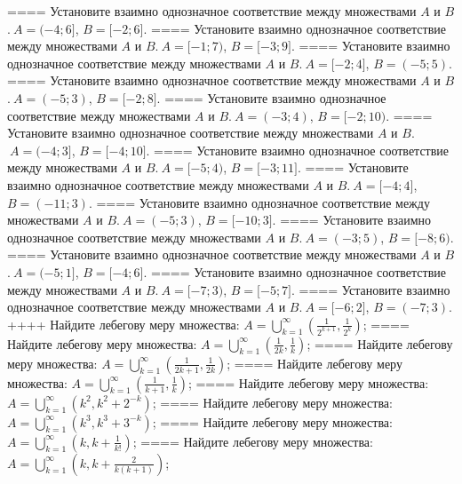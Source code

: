 ====
Установите взаимно однозначное соответствие между множествами \(A\) и \(B\).\(\ A = ( - 4;6\rbrack\), \(B = \lbrack - 2;6\rbrack\).
====
Установите взаимно однозначное соответствие между множествами \(A\) и \(B\).\(\ A = \lbrack - 1;7)\), \(B = \lbrack - 3;9\rbrack\).
====
Установите взаимно однозначное соответствие между множествами \(A\) и \(B\).\(\ A = \lbrack - 2;4\rbrack\), \(B = ( - 5;5)\).
====
Установите взаимно однозначное соответствие между множествами \(A\) и \(B\).\(\ A = ( - 5;3)\), \(B = \lbrack - 2;8\rbrack\).
====
Установите взаимно однозначное соответствие между множествами \(A\) и \(B\).\(\ A = ( - 3;4)\), \(B = \lbrack - 2;10)\).
====
Установите взаимно однозначное соответствие между множествами \(A\) и \(B\).\(\ A = ( - 4;3\rbrack\), \(B = \lbrack - 4;10\rbrack\).
====
Установите взаимно однозначное соответствие между множествами \(A\) и \(B\).\(\ A = \lbrack - 5;4)\), \(B = \lbrack - 3;11\rbrack\).
====
Установите взаимно однозначное соответствие между множествами \(A\) и \(B\).\(\ A = \lbrack - 4;4\rbrack\), \(B = ( - 11;3)\).
====
Установите взаимно однозначное соответствие между множествами \(A\) и \(B\).\(\ A = ( - 5;3)\), \(B = \lbrack - 10;3\rbrack\).
====
Установите взаимно однозначное соответствие между множествами \(A\) и \(B\).\(\ A = ( - 3;5)\), \(B = \lbrack - 8;6)\).
====
Установите взаимно однозначное соответствие между множествами \(A\) и \(B\).\(\ A = ( - 5;1\rbrack\), \(B = \lbrack - 4;6\rbrack\).
====
Установите взаимно однозначное соответствие между множествами \(A\) и \(B\).\(\ A = \lbrack - 7;3)\), \(B = \lbrack - 5;7\rbrack\).
====
Установите взаимно однозначное соответствие между множествами \(A\) и \(B\).\(\ A = \lbrack - 6;2\rbrack\), \(B = ( - 7;3)\).
++++
Найдите лебегову меру множества: \(A = \bigcup_{k = 1}^{\infty}\left( \frac{1}{2^{k + 1}},\frac{1}{2^{k}} \right)\);
====
Найдите лебегову меру множества: \(A = \bigcup_{k = 1}^{\infty}\left( \frac{1}{2k},\frac{1}{k} \right)\);
====
Найдите лебегову меру множества: \(A = \bigcup_{k = 1}^{\infty}\left( \frac{1}{2k + 1},\frac{1}{2k} \right)\);
====
Найдите лебегову меру множества: \(A = \bigcup_{k = 1}^{\infty}\left( \frac{1}{k + 1},\frac{1}{k} \right)\);
====
Найдите лебегову меру множества: \(A = \bigcup_{k = 1}^{\infty}\left( k^{2},k^{2} + 2^{- k} \right)\);
====
Найдите лебегову меру множества: \(A = \bigcup_{k = 1}^{\infty}\left( k^{3},k^{3} + 3^{- k} \right)\);
====
Найдите лебегову меру множества: \(A = \bigcup_{k = 1}^{\infty}\left( k,k + \frac{1}{k!} \right)\);
====
Найдите лебегову меру множества: \(A = \bigcup_{k = 1}^{\infty}\left( k,k + \frac{2}{k(k + 1)} \right)\);
